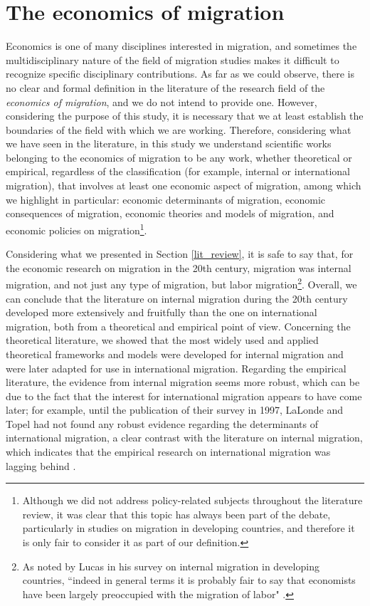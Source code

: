 \section{The economics of migration} \label{eco_migration}

Economics is one of many disciplines interested in migration, and sometimes the multidisciplinary nature of the field of migration studies makes it difficult to recognize specific disciplinary contributions. As far as we could observe, there is no clear and formal definition in the literature of the research field of the \textit{economics of migration}, and we do not intend to provide one. However, considering the purpose of this study, it is necessary that we at least establish the boundaries of the field with which we are working. Therefore, considering what we have seen in the literature, in this study we understand scientific works belonging to the economics of migration to be any work, whether theoretical or empirical, regardless of the classification (for example, internal or international migration), that involves at least one economic aspect of migration, among which we highlight in particular: economic determinants of migration, economic consequences of migration, economic theories and models of migration, and economic policies on migration\footnote{Although we did not address policy-related subjects throughout the literature review, it was clear that this topic has always been part of the debate, particularly in studies on migration in developing countries, and therefore it is only fair to consider it as part of our definition.}.

Considering what we presented in Section \ref{lit_review}, it is safe to say that, for the economic research on migration in the 20th century, migration was internal migration, and not just any type of migration, but labor migration\footnote{As noted by Lucas in his survey on internal migration in developing countries, ``indeed in general terms it is probably fair to say that economists have been largely preoccupied with the migration of labor" \citep[p. 786]{lucas_internal_1997}.}. Overall, we can conclude that the literature on internal migration during the 20th century developed more extensively and fruitfully than the one on international migration, both from a theoretical and empirical point of view. Concerning the theoretical literature, we showed that the most widely used and applied theoretical frameworks and models were developed for internal migration and were later adapted for use in international migration. Regarding the empirical literature, the evidence from internal migration seems more robust, which can be due to the fact that the interest for international migration appears to have come later; for example, until the publication of their survey in 1997, LaLonde and Topel had not found any robust evidence regarding the determinants of international migration, a clear contrast with the literature on internal migration, which indicates that the empirical research on international migration was lagging behind \citep{lalonde_economic_1997}.

